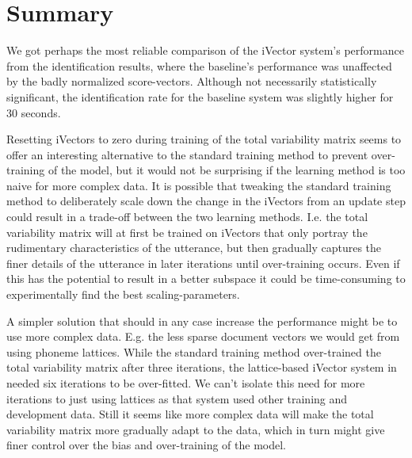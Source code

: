 \chapter{Summary}

We got perhaps the most reliable comparison of the iVector system's performance from the identification results, where the baseline's performance was unaffected by the badly normalized score-vectors. Although not necessarily statistically significant, the identification rate for the baseline system was slightly higher for 30 seconds.

Resetting iVectors to zero during training of the total variability matrix seems to offer an interesting alternative to the standard training method to prevent over-training of the model, but it would not be surprising if the learning method is too naive for more complex data. It is possible that tweaking the standard training method to deliberately scale down the change in the iVectors from an update step could result in a trade-off between the two learning methods. I.e. the total variability matrix will at first be trained on iVectors that only portray the rudimentary characteristics of the utterance, but then gradually captures the finer details of the utterance in later iterations until over-training occurs. Even if this has the potential to result in a better subspace it could be time-consuming to experimentally find the best scaling-parameters. 

A simpler solution that should in any case increase the performance might be to use more complex data. E.g. the less sparse document vectors we would get from using phoneme lattices. While the standard training method over-trained the total variability matrix after three iterations, the lattice-based iVector system in \cite{lrivector} needed six iterations to be over-fitted. We can't isolate this need for more iterations to just using lattices as that system used other training and development data. Still it seems like more complex data will make the total variability matrix more gradually adapt to the data, which in turn might give finer control over the bias and over-training of the model.







